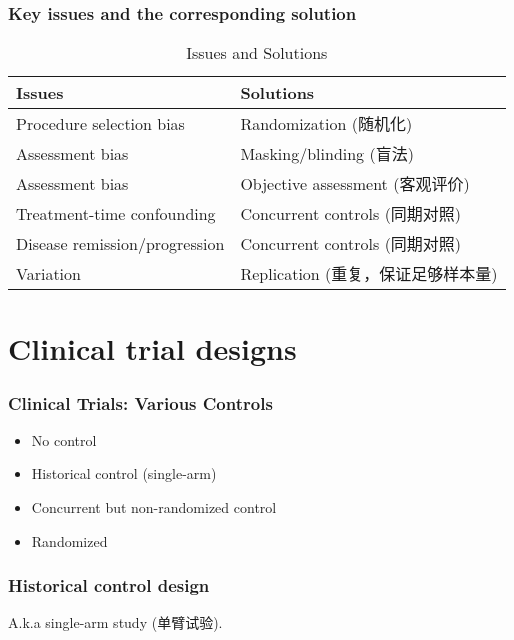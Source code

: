 \documentclass[table,10pt]{beamer}
\begin{document}
\begin{CJK*}{UTF8}{gbsn}
\begin{frame}[t]
\frametitle{Key issues and the corresponding solution}
\begin{table}
\footnotesize
\caption{Issues and Solutions}
\begin{tabular}{p{}p{}}
\hline
\textbf{Issues} & \textbf{Solutions}\\
\hline
Procedure selection bias & \alert{Randomization (随机化)}\\
\hline
Assessment bias & \alert{Masking/blinding (盲法)}\\
\hline
Assessment bias & Objective assessment (客观评价)\\
\hline
Treatment-time confounding & Concurrent controls (同期对照)\\
\hline
Disease remission/progression & Concurrent controls (同期对照)\\
\hline
Variation & \alert{Replication (重复，保证足够样本量)}\\
\hline
\end{tabular}
\end{table}
\end{frame}


\section{Clinical trial designs}

\begin{frame}[t]
\frametitle{Clinical Trials: Various Controls}
\begin{itemize}
	\item No control
	\item Historical control (single-arm)
	\item Concurrent but non-randomized control
	\item Randomized
\end{itemize}
\end{frame}

\begin{frame}[t]
\frametitle{Historical control design}
A.k.a \alert{single-arm study (单臂试验)}.


\end{frame}
\end{CJK*}
\end{document}

